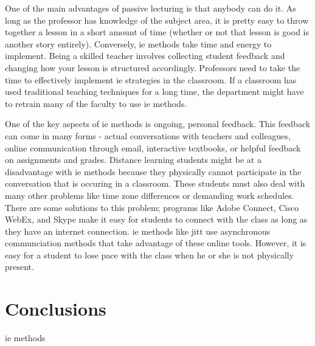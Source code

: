 One of the main advantages of passive lecturing is that anybody can do it. As long as the professor has knowledge of the subject area, it is pretty easy to throw together a lesson in a short amount of time (whether or not that lesson is good is another story entirely). Conversely, \gls{ie} methods take time and energy to implement. Being a skilled teacher involves collecting student feedback and changing how your lesson is structured accordingly. Professors need to take the time to effectively implement \gls{ie} strategies in the classroom. If a classroom has used traditional teaching techniques for a long time, the department might have to retrain many of the faculty to use \gls{ie} methods.

One of the key aspects of \gls{ie} methods is ongoing, personal feedback. This feedback can come in many forms - actual conversations with teachers and colleagues, online communication through email, interactive textbooks, or helpful feedback on assignments and grades. Distance learning students might be at a disadvantage with \gls{ie} methods because they physically cannot participate in the conversation that is occuring in a classroom. These students must also deal with many other problems like time zone differences or demanding work schedules. There are some solutions to this problem; programs like Adobe Connect, Cisco WebEx, and Skype make it easy for students to connect with the class as long as they have an internet connection. \gls{ie} methods like \gls{jitt} use asynchronous communciation methods that take advantage of these online tools. However, it is easy for a student to lose pace with the class when he or she is not physically present.

\section{Conclusions}

\gls{ie} methods
